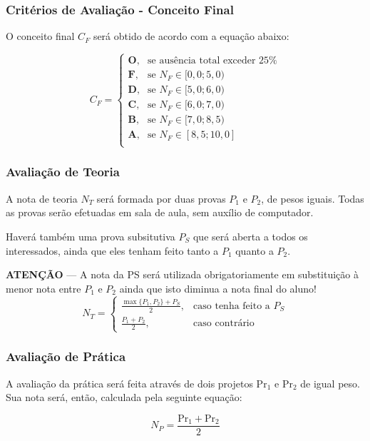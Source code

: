 \documentclass[Ligatures=TeX,table,brazil,svgnames,usetotalslideindicator,comp
ress,10pt]{beamer}
\begin{document}
\begin{frame}
  \frametitle{Critérios de Avaliação - Conceito Final}
  O conceito final \(C_F\) será obtido de acordo com a equação abaixo:

\begin{equation*}
C_F =
    \begin{cases}
    \textbf{O} ,& \text{se ausência total exceder 25\%}\\
    \textbf{F} ,& \text{se } N_F \in [0,0;5,0) \\
    \textbf{D} ,& \text{se } N_F \in [5,0;6,0) \\
    \textbf{C} ,& \text{se } N_F \in [6,0;7,0) \\
    \textbf{B} ,& \text{se } N_F \in [7,0;8,5) \\
    \textbf{A} ,& \text{se } N_F \in [8,5;10,0] \\
    \end{cases}
\end{equation*}
\end{frame}

\begin{frame}
  \frametitle{Avaliação de Teoria}
  A nota de teoria \(N_T\) será formada por duas provas \(P_1\) e \(P_2\),
  de pesos iguais.  Todas as provas serão efetuadas em sala de aula,
  sem auxílio de computador.



  Haverá também uma prova subsitutiva \(P_S\) que será aberta a todos
  os interessados, ainda que eles tenham feito tanto a \(P_1\) quanto
  a \(P_2\).

  \textbf{ATENÇÃO} --- A nota da PS será utilizada obrigatoriamente em
  substituição à menor nota entre \(P_1\) e \(P_2\) ainda que isto
  diminua a nota final do aluno!
\begin{equation*}
N_T =
    \begin{cases}
    \frac {\max \{P_1, P_2\} + P_S}{2} ,& \text{caso tenha feito a } P_S \\
    \frac {P_1 + P_2}{2}               ,& \text{caso contrário}
    \end{cases}
\end{equation*}

\end{frame}


\begin{frame}
  \frametitle{Avaliação de Prática}

  A avaliação da prática será feita através de dois projetos
  \(\text{Pr}_1\) e \(\text{Pr}_2\) de igual peso. Sua nota será,
  então, calculada pela seguinte equação:

\begin{equation*}
N_P = \frac {\text{Pr}_1 + \text{Pr}_2}{2}
\end{equation*}

\end{frame}
\end{document}
